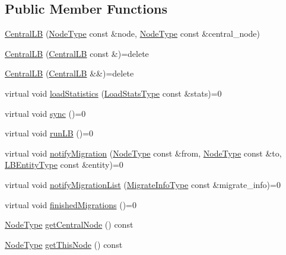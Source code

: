 \subsection*{Public Member Functions}
\begin{DoxyCompactItemize}
\item 
\hyperlink{structvt_1_1lb_1_1centralized_1_1_central_l_b_a6d9fc1b18d9324ed7b4fde9b4402f362}{Central\+LB} (\hyperlink{namespacevt_a866da9d0efc19c0a1ce79e9e492f47e2}{Node\+Type} const \&node, \hyperlink{namespacevt_a866da9d0efc19c0a1ce79e9e492f47e2}{Node\+Type} const \&central\+\_\+node)
\item 
\hyperlink{structvt_1_1lb_1_1centralized_1_1_central_l_b_aa0fcbec516d85fc7fbdfe2ac436d3dc7}{Central\+LB} (\hyperlink{structvt_1_1lb_1_1centralized_1_1_central_l_b}{Central\+LB} const \&)=delete
\item 
\hyperlink{structvt_1_1lb_1_1centralized_1_1_central_l_b_a90c17141afbb48c0765891bad941a5cc}{Central\+LB} (\hyperlink{structvt_1_1lb_1_1centralized_1_1_central_l_b}{Central\+LB} \&\&)=delete
\item 
virtual void \hyperlink{structvt_1_1lb_1_1centralized_1_1_central_l_b_a6ff14c12979d3f7e34258640ac01df9c}{load\+Statistics} (\hyperlink{structvt_1_1lb_1_1centralized_1_1_central_l_b_aafbf9d4fbe90a3561fd812661c970b2d}{Load\+Stats\+Type} const \&stats)=0
\item 
virtual void \hyperlink{structvt_1_1lb_1_1centralized_1_1_central_l_b_a387d927741a5365094b21c988933e171}{sync} ()=0
\item 
virtual void \hyperlink{structvt_1_1lb_1_1centralized_1_1_central_l_b_a758e6e57f66a6ad143cef6156294c98d}{run\+LB} ()=0
\item 
virtual void \hyperlink{structvt_1_1lb_1_1centralized_1_1_central_l_b_af7a0204c9839ccf77a2fd724a2c9841c}{notify\+Migration} (\hyperlink{namespacevt_a866da9d0efc19c0a1ce79e9e492f47e2}{Node\+Type} const \&from, \hyperlink{namespacevt_a866da9d0efc19c0a1ce79e9e492f47e2}{Node\+Type} const \&to, \hyperlink{namespacevt_a92ec26fb6644cd0ba7eb0ee70c96bee5}{L\+B\+Entity\+Type} const \&entity)=0
\item 
virtual void \hyperlink{structvt_1_1lb_1_1centralized_1_1_central_l_b_a478778a92cd3a05b9aa4b2b417cb4a4b}{notify\+Migration\+List} (\hyperlink{structvt_1_1lb_1_1centralized_1_1_central_l_b_a8d393c0126180fb8cce2b881c23df44f}{Migrate\+Info\+Type} const \&migrate\+\_\+info)=0
\item 
virtual void \hyperlink{structvt_1_1lb_1_1centralized_1_1_central_l_b_af989072d4e6277bb8d1dfab6638a335d}{finished\+Migrations} ()=0
\item 
\hyperlink{namespacevt_a866da9d0efc19c0a1ce79e9e492f47e2}{Node\+Type} \hyperlink{structvt_1_1lb_1_1centralized_1_1_central_l_b_a5eea478088d9a7983df9d3acd02b3291}{get\+Central\+Node} () const
\item 
\hyperlink{namespacevt_a866da9d0efc19c0a1ce79e9e492f47e2}{Node\+Type} \hyperlink{structvt_1_1lb_1_1centralized_1_1_central_l_b_aaa17c1f34752528891b287df90809a72}{get\+This\+Node} () const
\end{DoxyCompactItemize}
